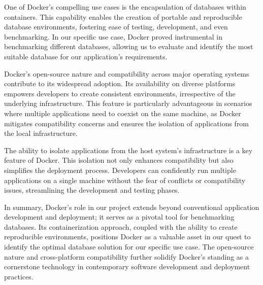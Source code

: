 One of Docker's compelling use cases is the encapsulation of databases within containers. This capability enables the creation of portable and reproducible 
database environments, fostering ease of testing, development, and even benchmarking. In our specific use case, Docker proved instrumental in benchmarking 
different databases, allowing us to evaluate and identify the most suitable database for our application's requirements.\newline

Docker's open-source nature and compatibility across major operating systems contribute to its widespread adoption. Its availability on diverse platforms 
empowers developers to create consistent environments, irrespective of the underlying infrastructure. This feature is particularly advantageous in scenarios 
where multiple applications need to coexist on the same machine, as Docker mitigates compatibility concerns and ensures the isolation of applications from the 
local infrastructure.\newline

The ability to isolate applications from the host system's infrastructure is a key feature of Docker. This isolation not only enhances compatibility but also 
simplifies the deployment process. Developers can confidently run multiple applications on a single machine without the fear of conflicts or compatibility 
issues, streamlining the development and testing phases.\newline

In summary, Docker's role in our project extends beyond conventional application development and deployment; it serves as a pivotal tool for benchmarking 
databases. Its containerization approach, coupled with the ability to create reproducible environments, positions Docker as a valuable asset in our quest to 
identify the optimal database solution for our specific use case. The open-source nature and cross-platform compatibility further solidify Docker's standing as 
a cornerstone technology in contemporary software development and deployment practices.

\filbreak
